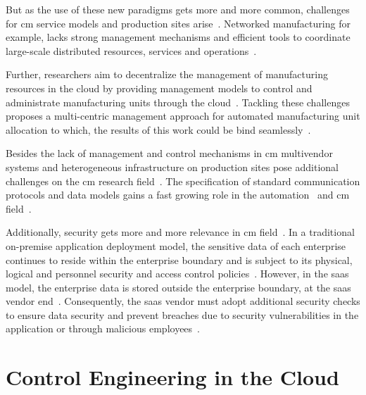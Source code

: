\documentclass[
a4paper,
twoside,
headsepline,
cleardoublepage=empty,
parskip=half,
draft=false
]{scrbook}
\begin{document}
			But as the use of these new paradigms gets more and more common, challenges for \gls{cm} service models and production sites arise~\cite{zhou2018diverse}.
			Networked manufacturing for example, lacks strong management mechanisms and efficient tools to coordinate large-scale distributed resources, services and operations~\cite{lin2017multi}.
			
			Further, researchers aim to decentralize the management of manufacturing resources in the cloud by providing management models to control and administrate manufacturing units through the cloud~\cite{tao2017sdmsim}. 
			Tackling these challenges ~\cite{lin2017multi} proposes a multi-centric management approach for automated manufacturing unit allocation to which, the results of this work could be bind seamlessly~\cite{adamson2017cloud}.
			
			Besides the lack of management and control mechanisms in \gls{cm} multivendor systems and heterogeneous infrastructure on production sites pose additional challenges on the \gls{cm} research field~\cite{tuna2017survey}.
			The specification of standard communication protocols and data models gains a fast growing role in the automation~\cite{ren2017cloud} and \gls{cm} field~\cite{wollschlaeger2017future}.
			
			Additionally, security gets more and more relevance in \gls{cm} field~\cite{tuna2017survey}.
			In a traditional on-premise application deployment model, the sensitive data of each enterprise continues to reside within the enterprise boundary and is subject to its physical, logical and personnel security and access control policies~\cite{jeschke2017industrial}. 
			However, in the \gls{saas} model, the enterprise data is stored outside the enterprise boundary, at the \gls{saas} vendor end~\cite{adamson2017cloud}.
			Consequently, the \gls{saas} vendor must adopt additional security checks to ensure data security and prevent breaches due to security vulnerabilities in the application or through malicious employees~\cite{chen2017machine}.

		\section{Control Engineering in the Cloud}\label{sec:control_engineering_in_the_cloud}
\end{document}
